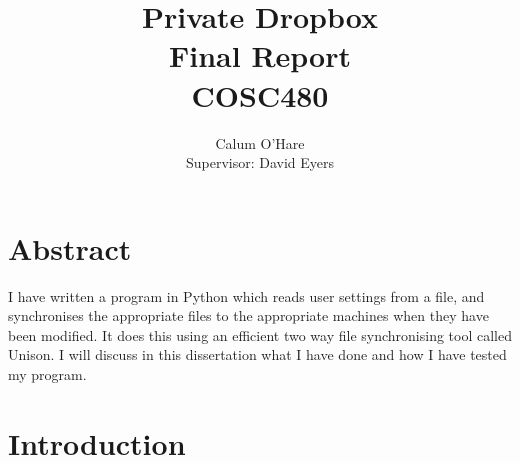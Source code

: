 \documentclass[12pt]{article}
\title{ Private Dropbox \\ Final Report \\ COSC480}
\author{Calum O'Hare \\ Supervisor: David Eyers}
\date{}
\begin{document}
\maketitle

\newpage
\section*{Abstract}
I have written a program in Python which reads user
settings from a file, and synchronises the appropriate files
to the appropriate machines when they have been modified.
It does this using an efficient two way file synchronising tool called
Unison. I will discuss in this dissertation what I have done and
how I have tested my program.
\newpage

\tableofcontents
\newpage

\section{Introduction}
\end{document}
